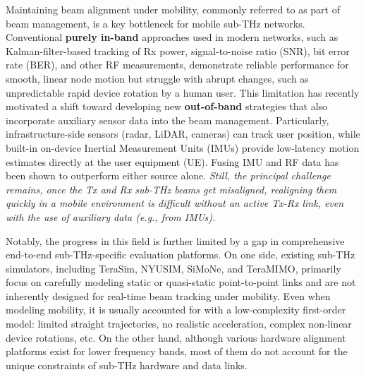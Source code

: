 \documentclass[fleqn,10pt]{wlscirep}
\begin{document}
Maintaining beam alignment under mobility, commonly referred to as part of beam management, is a key bottleneck for mobile sub-THz networks\cite{Giordani2018ATO, 10422712, Wang2022}. Conventional \textbf{purely in-band} approaches used in modern networks, such as Kalman-filter-based tracking of Rx power, signal-to-noise ratio (SNR), bit error rate (BER), and other RF measurements\cite{8455289,9145366,10067030, 10123123}, demonstrate reliable performance for smooth, linear node motion but struggle with abrupt changes, such as unpredictable rapid device rotation by a human user\cite{Wang2022}. This limitation has recently motivated a shift toward developing new \textbf{out-of-band} strategies that also incorporate auxiliary sensor data into the beam management\cite{10494372, Azari2022, Nokia2022, Chen2023, Jornet2023}. Particularly, infrastructure-side sensors (radar, LiDAR, cameras) can track user position\cite{10422712,5GPPP_Automotive_Vision_2015}, while built-in on-device Inertial Measurement Units (IMUs) provide low-latency motion estimates directly at the user equipment (UE). Fusing IMU and RF data has been shown to outperform either source alone\cite{10036372,9391649,electronics8020142, s21082723, 9814507}. \emph{Still, the principal challenge remains, once the Tx and Rx sub-THz beams get misaligned, realigning them quickly in a mobile environment is difficult without an active Tx-Rx link, even with the use of auxiliary data (e.g., from IMUs).}

Notably, the progress in this field is further limited by a gap in comprehensive end-to-end sub-THz-specific evaluation platforms. On one side, existing sub-THz simulators, including TeraSim\cite{HOSSAIN2019100004}, NYUSIM\cite{10367974}, SiMoNe\cite{rose2015simone, eckhardt2022modular}, and TeraMIMO\cite{tarboush2021teramimo, bodet2023directional}, primarily focus on carefully modeling static or quasi-static point-to-point links and are not inherently designed for real-time beam tracking under mobility\cite{Petrov2023Mobile}. Even when modeling mobility, it is usually accounted for with a low-complexity first-order model: limited straight trajectories, no realistic acceleration, complex non-linear device rotations, etc. On the other hand, although various hardware alignment platforms exist for lower frequency bands\cite{Abdulwahab2020, Keshavamurthy2022, AlAkkoumi2008}, most of them do not account for the unique constraints of sub-THz hardware and data links.
\end{document}
